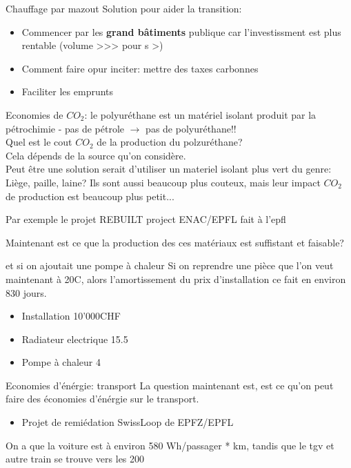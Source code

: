 \begin{parag}{Chauffage par mazout}
Solution pour aider la transition:
\begin{itemize}
    \item Commencer par les \textbf{grand bâtiments} publique car l'investissment est plus rentable (volume >>> pour s >)
    \item Comment faire opur inciter: mettre des taxes carbonnes
    \item Faciliter les emprunts
\end{itemize}
Economies de $CO_2$: le polyuréthane est un matériel isolant produit par la pétrochimie - pas de pétrole $\to$ pas de polyuréthane!!\\
Quel est le cout $CO_2$ de la production du polzuréthane?\\Cela dépends de la source qu'on considère.\\
Peut être une solution serait d'utiliser un materiel isolant plus vert du genre: Liège, paille, laine? Ils sont aussi beaucoup plus couteux, mais leur impact $CO_2$ de production est beaucoup plus petit...\\
\begin{framedremark}
Par exemple le projet REBUILT project ENAC/EPFL fait à l'epfl
\end{framedremark}
Maintenant est ce que la production des ces matériaux est suffistant et faisable?
\begin{subparag}{et si on ajoutait une pompe à chaleur}
    Si on reprendre une pièce que l'on veut maintenant à 20C, alors l'amortissement du prix d'installation ce fait en environ 830 jours.\\
    \begin{itemize}
	    \item Installation 10'000CHF
	    \item Radiateur electrique 15.5
	    \item Pompe à chaleur 4
    \end{itemize}
    
\end{subparag}
\end{parag}
\begin{parag}{Economies d'énérgie: transport}
    La question maintenant est, est ce qu'on peut faire des économies d'énérgie sur le transport. 
    \begin{itemize}
	    \item Projet de remiédation SwissLoop de EPFZ/EPFL
    \end{itemize}
    On a que la voiture est à environ 580 Wh/passager * km, tandis que le tgv et autre train se trouve vers les 200
    
\end{parag}






